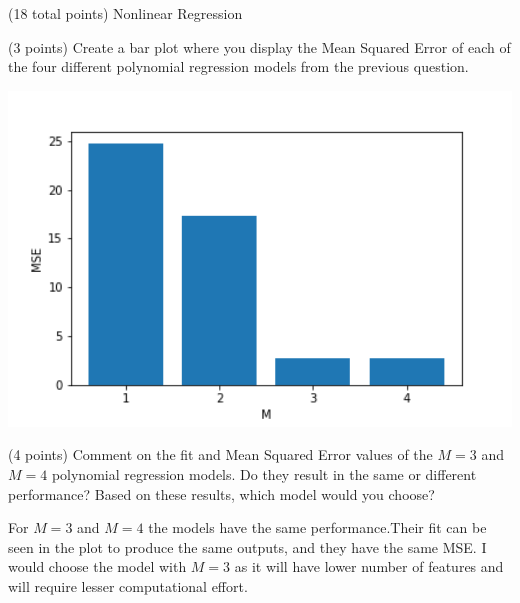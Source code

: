 \documentclass[12pt]{article}
\begin{document}
\begin{question}{(18 total points) Nonlinear Regression}
\begin{subquestion}{(3 points) Create a bar plot where you display the Mean Squared Error of each of the four different polynomial regression models from the previous question.}
\begin{answerbox}{35em}
\begin{center}
    \includegraphics[width=1\textwidth]{results/nonlinear-mse-bar.png}
\end{center}
\end{answerbox}



\end{subquestion}


%
%
\begin{subquestion}{(4 points) Comment on the fit and Mean Squared Error values of the $M=3$ and $M=4$ polynomial regression models. 
Do they result in the same or different performance? 
Based on these results, which model would you choose?}


\begin{answerbox}{15em}
For $M=3$ and $M=4$ the models have the same performance.Their fit can be seen in the plot to produce the same outputs, and they have the same MSE. I would choose the model with $M=3$ as it will have lower number of features and will require lesser computational effort.
\end{answerbox}



\end{subquestion}




\end{question}
\end{document}
